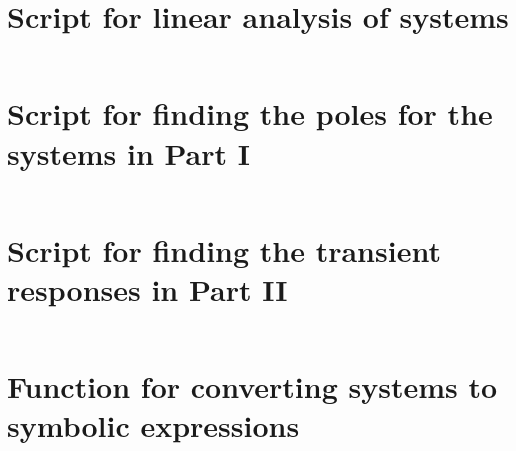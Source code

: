 \documentclass[11pt]{article}
\begin{document}
\section{Script for linear analysis of systems}\label{apx:linear analysis}
\inputminted{matlab}{lab0405/programs/lin_analysis_m1.m}

\section{Script for finding the poles for the systems in Part I}\label{apx:part 01 pz map}
\inputminted{matlab}{lab0405/programs/part01_poles_zeros_m1.m}

\section{Script for finding the transient responses in Part II}\label{apx:part 03 transient responses}
\inputminted{matlab}{lab0405/programs/part02_transient_response_m1.m}

\section{Function for converting systems to symbolic expressions}
\inputminted{matlab}{lab0405/programs/sys2sym.m}
\end{document}
